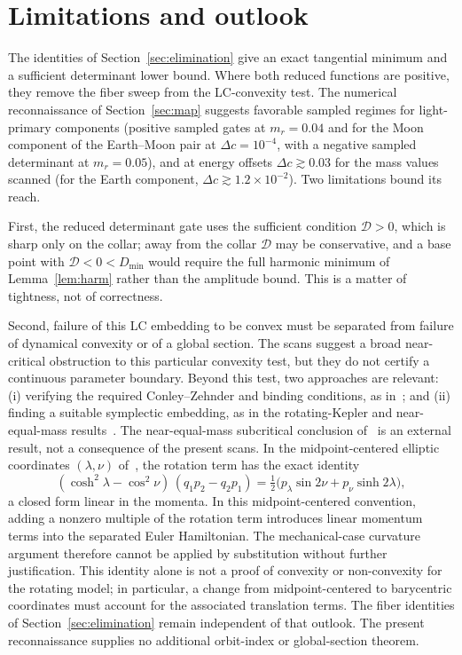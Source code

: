 \documentclass[11pt,reqno]{amsart}
\theoremstyle{plain}
\theoremstyle{definition}
\newcommand{\calD}{\mathcal{D}}
\begin{document}
\section{Limitations and outlook}\label{sec:outlook}

The identities of Section~\ref{sec:elimination} give an exact tangential minimum and a sufficient determinant lower bound. Where both reduced functions are positive, they remove the fiber sweep from the LC-convexity test. The numerical reconnaissance of Section~\ref{sec:map} suggests favorable sampled regimes for light-primary components (positive sampled gates at $m_r=0.04$ and for the Moon component of the Earth--Moon pair at $\Delta c=10^{-4}$, with a negative sampled determinant at $m_r=0.05$), and at energy offsets $\Delta c\gtrsim 0.03$ for the mass values scanned (for the Earth component, $\Delta c\gtrsim 1.2\times 10^{-2}$). Two limitations bound its reach.

First, the reduced determinant gate uses the sufficient condition $\calD>0$, which is sharp only on the collar; away from the collar $\calD$ may be conservative, and a base point with $\calD<0<D_{\min}$ would require the full harmonic minimum of Lemma~\ref{lem:harm} rather than the amplitude bound. This is a matter of tightness, not of correctness.

Second, failure of this LC embedding to be convex must be separated from failure of dynamical convexity or of a global section. The scans suggest a broad near-critical obstruction to this particular convexity test, but they do not certify a continuous parameter boundary. Beyond this test, two approaches are relevant: (i) verifying the required Conley--Zehnder and binding conditions, as in~\cite{HS,LSPCR,LSHill}; and (ii) finding a suitable symplectic embedding, as in the rotating-Kepler and near-equal-mass results~\cite{FKZ,LSPCR}. The near-equal-mass subcritical conclusion of~\cite{LSPCR} is an external result, not a consequence of the present scans. In the midpoint-centered elliptic coordinates $(\lambda,\nu)$ of~\cite{Kim}, the rotation term has the exact identity
\begin{equation}\label{eq:rotation}
(\cosh^2\lambda-\cos^2\nu)\,(q_1 p_2 - q_2 p_1) = \tfrac12\bigl(p_\lambda\sin 2\nu + p_\nu\sinh 2\lambda\bigr),
\end{equation}
a closed form linear in the momenta. In this midpoint-centered convention, adding a nonzero multiple of the rotation term introduces linear momentum terms into the separated Euler Hamiltonian. The mechanical-case curvature argument therefore cannot be applied by substitution without further justification. This identity alone is not a proof of convexity or non-convexity for the rotating model; in particular, a change from midpoint-centered to barycentric coordinates must account for the associated translation terms. The fiber identities of Section~\ref{sec:elimination} remain independent of that outlook. The present reconnaissance supplies no additional orbit-index or global-section theorem.
\end{document}

